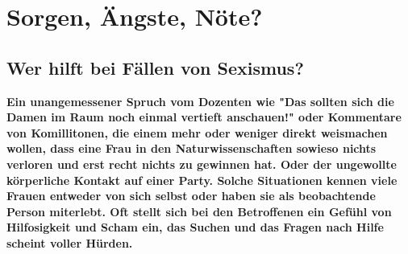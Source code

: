 \section{Sorgen, Ängste, Nöte?}
\subsection{Wer hilft bei Fällen von Sexismus?}
\textbf{Ein unangemessener Spruch vom Dozenten wie "Das sollten sich die Damen im Raum noch einmal vertieft anschauen!" oder Kommentare von Komillitonen, die einem mehr oder weniger direkt weismachen wollen, dass eine Frau in den Naturwissenschaften sowieso nichts verloren und erst recht nichts zu gewinnen hat. Oder der ungewollte körperliche Kontakt auf einer Party. Solche Situationen kennen viele Frauen entweder von sich selbst oder haben sie als beobachtende Person miterlebt. Oft stellt sich bei den Betroffenen ein Gefühl von Hilfosigkeit und Scham ein, das Suchen und das Fragen nach Hilfe scheint voller Hürden.} 

